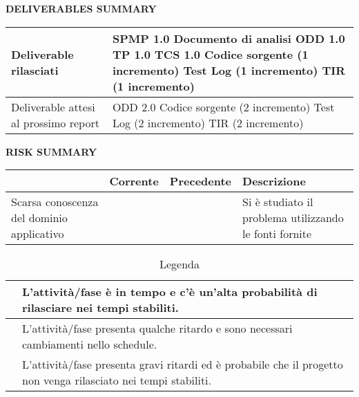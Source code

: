 \begin{center} \textbf{DELIVERABLES SUMMARY} \end{center}
\begin{table}[ht]
\centering
\begin{tabular}{|g|p{8cm}|}
  \hline
  Deliverable rilasciati				& \footnotesize SPMP 1.0\newline
							Documento di analisi\newline
							ODD 1.0\newline
							TP 1.0\newline
							TCS 1.0\newline
							Codice sorgente (1 incremento)\newline
							Test Log (1 incremento)\newline
							TIR (1 incremento)\\
  \hline
  Deliverable attesi al prossimo report 		& \footnotesize ODD 2.0\newline
							Codice sorgente (2 incremento)\newline
							Test Log (2 incremento)\newline
							TIR (2 incremento)\\
  \hline
\end{tabular}
\end{table}
\newpage

\begin{center} \textbf{RISK SUMMARY} \end{center}
\begin{table}[ht]
\centering
\begin{tabular}{|p{3cm}|p{2cm}|p{2cm}|p{5cm}|}
  \hline
  \rowcolor{Gray}	& Corrente		& Precedente		& Descrizione\\
  \hline
  \footnotesize Scarsa conoscenza del dominio applicativo	& \cellcolor{green}	& \cellcolor{yellow}			& \footnotesize Si è studiato il problema utilizzando le fonti fornite\\
  \hline
\end{tabular}
\end{table}

\begin{table}[b]
 \centering
 \begin{tabular}{|p{3cm}|p{10cm}|}
  \hline
  \cellcolor{green}			& L'attività/fase è in tempo e c'è un'alta probabilità di rilasciare nei tempi stabiliti.\\
  \hline
  \cellcolor{yellow}			& L'attività/fase presenta qualche ritardo e sono necessari cambiamenti nello schedule.\\
  \hline
  \cellcolor{red}			& L'attività/fase presenta gravi ritardi ed è probabile che il progetto non venga rilasciato nei tempi stabiliti.\\
  \hline
 \end{tabular}
 \caption{Legenda}
\end{table}

